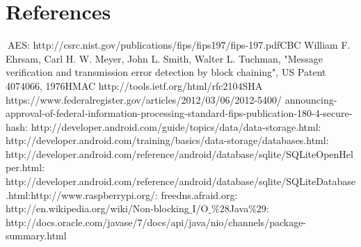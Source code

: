\documentclass{report}
\begin{document}
\section{References}
\vspace{-3mm}
$\:$\newline
[1] AES: http://csrc.nist.gov/publications/fips/fips197/fips-197.pdf\newline
[2] CBC William F. Ehrsam, Carl H. W. Meyer, John L. Smith, Walter L. Tuchman,
"Message verification and transmission error detection by block chaining", US Patent 4074066, 1976\newline
[3] HMAC http://tools.ietf.org/html/rfc2104\newline
[4] SHA https://www.federalregister.gov/\newline articles/2012/03/06/2012-5400/ announcing-approval-of-federal-information-processing-standard-fips-publication-180-4-secure-hash\newline
[5]: http://developer.android.com/guide/topics/data/data-storage.html\newline
[6]: http://developer.android.com/training/basics/data-storage/\newline databases.html\newline
[7]: http://developer.android.com/reference/android/database/\newline sqlite/SQLiteOpenHelper.html\newline
[8]: http://developer.android.com/reference/android/database/\newline sqlite/SQLiteDatabase.html\newline
[9]:http://www.raspberrypi.org/\newline
[10]: freedns.afraid.org\newline
[11]: http://en.wikipedia.org/wiki/Non-blocking$\_$I/O$\_$$\%$28Java$\%$29\newline
[12]: http://docs.oracle.com/javase/7/docs/api/java/nio/channels/\newline package-summary.html\newline





\end{document}
